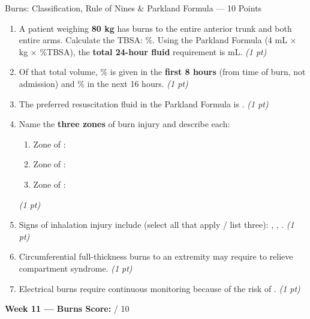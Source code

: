 \documentclass[11pt,letterpaper]{article}
\newcommand{\blank}[1][3cm]{\underline{\hspace{#1}}}
\begin{document}
\begin{diagbox}{Burns: Classification, Rule of Nines \& Parkland Formula --- 10 Points}
\begin{enumerate}[leftmargin=1.5em, label=\textbf{\arabic*.},start=111]
  \item A patient weighing \textbf{80 kg} has burns to the entire anterior trunk and
        both entire arms.  Calculate the TBSA: \blank[2cm]\%.
        Using the Parkland Formula (4 mL $\times$ kg $\times$ \%TBSA), the
        \textbf{total 24-hour fluid} requirement is \blank[3cm] mL.
        \hfill\textit{(1 pt)}

  \item Of that total volume, \blank[1.5cm]\% is given in the \textbf{first 8 hours}
        (from time of burn, not admission) and \blank[1.5cm]\% in the next 16 hours.
        \hfill\textit{(1 pt)}

  \item The preferred resuscitation fluid in the Parkland Formula is
        \blank[4cm].
        \hfill\textit{(1 pt)}

  \item Name the \textbf{three zones} of burn injury and describe each:
        \begin{enumerate}[label=\arabic*.]
          \item Zone of \blank[2.5cm]: \blank[5cm]
          \item Zone of \blank[2.5cm]: \blank[5cm]
          \item Zone of \blank[2.5cm]: \blank[5cm]
        \end{enumerate}
        \hfill\textit{(1 pt)}

  \item Signs of inhalation injury include (select all that apply / list three):
        \blank[3.5cm], \blank[3.5cm], \blank[3.5cm].
        \hfill\textit{(1 pt)}

  \item Circumferential full-thickness burns to an extremity may require
        \blank[4cm] to relieve compartment syndrome.
        \hfill\textit{(1 pt)}

  \item Electrical burns require continuous \blank[3cm] monitoring because
        of the risk of \blank[4cm].
        \hfill\textit{(1 pt)}

\end{enumerate}

\vspace{0.3cm}
\textbf{Week 11 --- Burns Score:} \blank[1cm] / 10
\end{diagbox}

\newpage

\end{document}
